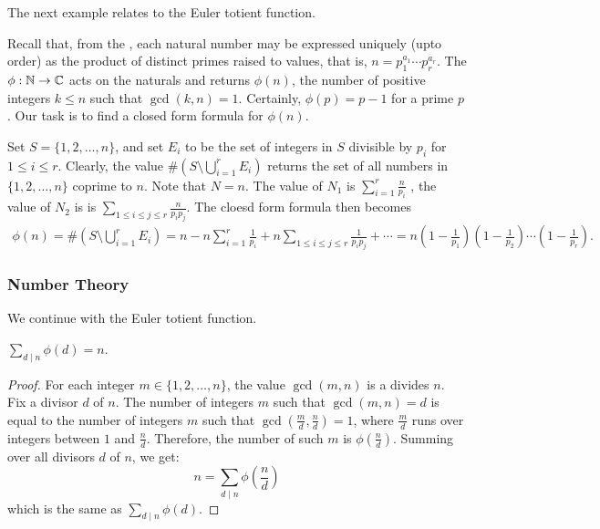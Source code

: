 The next example relates to the Euler totient function.

\begin{example}
    Recall that, from the , each natural number may be expressed uniquely (upto order) as the product of distinct primes raised to values, that is, $n = p_{1}^{a_{1}} \cdots p_{r}^{a_{r}}$. The  $\phi: \mathbb{N} \to \mathbb{C}$ acts on the naturals and returns $\phi(n)$, the number of positive integers $k \leq n$ such that $\gcd (k,n) = 1$. Certainly, $\phi(p) = p-1$ for a prime $p$. Our task is to find a closed form formula for $\phi(n)$.

    Set $S = \{1,2,\ldots,n\}$, and set $E_{i}$ to be the set of integers in $S$ divisible by $p_{i}$ for $1 \leq i \leq r$. Clearly, the value $\# (S \setminus \bigcup_{i=1}^{r} E_{i})$ returns the set of all numbers in $\{1,2,\ldots,n\}$ coprime to $n$. Note that $N = n$. The value of $N_{1}$ is $\sum_{i=1}^{r} \frac{n}{p_{i}}$ , the value of $N_{2}$ is is $\sum_{1 \leq i \leq j \leq r} \frac{n}{p_{i}p_{j}}$. The cloesd form formula then becomes
    \begin{align}
        \phi(n) = \# (S \setminus \bigcup_{i=1}^{r} E_{i}) = n - n \sum_{i=1}^{r} \frac{1}{p_{i}} + n \sum_{1 \leq i \leq j \leq r} \frac{1}{p_{i}p_{j}} + \cdots = n\left( 1-\frac{1}{p_{1}} \right)\left( 1-\frac{1}{p_{2}} \right) \cdots \left( 1-\frac{1}{p_{r}} \right).
    \end{align}
\end{example}


\subsubsection{Number Theory}
We continue with the Euler totient function.
\begin{theorem}
    $\sum \limits_{d \mid n} \phi(d) = n$.
\end{theorem}
\begin{proof}
    For each integer $m \in \{1, 2, \ldots, n\}$, the value $\gcd(m, n)$ is a divides $n$. Fix a divisor $d$ of $n$. The number of integers $m$ such that $\gcd(m, n) = d$ is equal to the number of integers $m$ such that $\gcd\left(\frac{m}{d}, \frac{n}{d}\right) = 1$, where $\frac{m}{d}$ runs over integers between $1$ and $\frac{n}{d}$.
    Therefore, the number of such $m$ is $\phi\left(\frac{n}{d}\right)$. Summing over all divisors $d$ of $n$, we get:
    \[
        n = \sum_{d \mid n} \phi\left(\frac{n}{d}\right)
    \]
    which is the same as $\sum_{d \mid n} \phi(d)$.
\end{proof}

